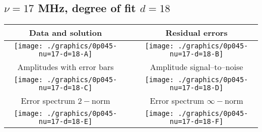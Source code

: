 

% 

\clearpage{}
\break{}

\subsection{$\nu = 17$ MHz, degree of fit $d = 18$}

\begin{table}[h]
    \begin{center}
        \begin{tabular}{ccc}
            Data and solution & \quad & Residual errors \\\hline
            \texttt{[image: ./graphics/0p045-nu=17-d=18-A]} &&
            \texttt{[image: ./graphics/0p045-nu=17-d=18-B]} \\[15pt]
            Amplitudes with error bars && Amplitude signal--to--noise \\\hline
            \texttt{[image: ./graphics/0p045-nu=17-d=18-C]} &&
            \texttt{[image: ./graphics/0p045-nu=17-d=18-D]} \\[15pt]
            Error spectrum $2-$norm && Error spectrum $\infty-$norm \\\hline
            \texttt{[image: ./graphics/0p045-nu=17-d=18-E]} &&
            \texttt{[image: ./graphics/0p045-nu=17-d=18-F]} \\[15pt]
        \end{tabular}
    \end{center}
\label{fig:elev=45, nu=17}
\end{table}



\endinput

